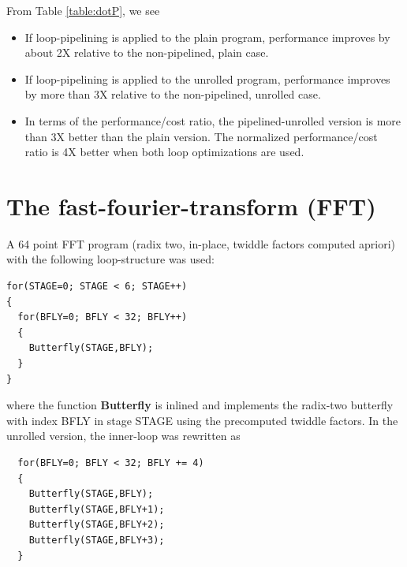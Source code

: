 \documentclass[conference]{IEEEtran}
\begin{document}
From Table \ref{table:dotP}, we see 
\begin{itemize}
\item If loop-pipelining is 
applied to the plain program, performance improves
by about 2X relative to the non-pipelined, plain case.
\item If loop-pipelining is applied to the unrolled program,
performance improves by more than 3X relative to the non-pipelined,
unrolled case.  
\item In terms of the performance/cost
ratio, the pipelined-unrolled version is more than 3X better than
the plain version.   The normalized performance/cost ratio is 4X
better when both loop optimizations are used.
\end{itemize}



\section{The fast-fourier-transform (FFT)}

A 64 point FFT program (radix two, in-place, twiddle factors computed
apriori) with the following loop-structure was used:
\begin{verbatim}
for(STAGE=0; STAGE < 6; STAGE++)
{
  for(BFLY=0; BFLY < 32; BFLY++)
  {
    Butterfly(STAGE,BFLY);
  }
}
\end{verbatim} 
where the function {\bf Butterfly} is inlined and implements
the radix-two butterfly with index BFLY in stage STAGE using
the precomputed twiddle factors.
In the unrolled version, the inner-loop was rewritten as
\begin{verbatim}
  for(BFLY=0; BFLY < 32; BFLY += 4)
  {
    Butterfly(STAGE,BFLY);
    Butterfly(STAGE,BFLY+1);
    Butterfly(STAGE,BFLY+2);
    Butterfly(STAGE,BFLY+3);
  }
\end{verbatim}
\end{document}
